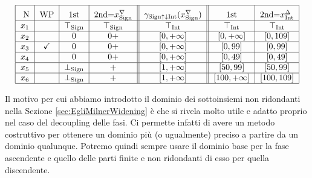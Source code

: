 \begin{example}
\begin{table}[H]
\begin{minipage}{\textwidth}
\[\begin{tabular}{|c|c|c|c||c||c|c|c||}
        \hline 
        \rule{0pt}{14pt} N & WP & 1st & 2nd=\(x^{\nabla}_{\textrm{Sign}}\) & 
        \(\gamma_{\textrm{Sign}\uparrow\downarrow\textrm{Int}}(x^{\nabla}_{\textrm{Sign}})\)& 
        1st & 2nd=\(x^{\Delta}_{\textrm{Int}}\)  \\
        \hline
        $x_1$ &  &  
            $\top_{\textrm{Sign}}$ & $\top_{\textrm{Sign}}$ & 
            $\top_{\textrm{Int}}$ & 
            $\top_{\textrm{Int}}$ & $\top_{\textrm{Int}}$ \\
        \hline
        $x_2$ &  & 
            0 & 0+ & 
            $\left[0, +\infty \right]$ & 
            $\left[0, +\infty \right]$ & $\left[0, 109\right]$ \\
        \hline
        $x_3$ & \checkmark & 
            0 & 0+ & 
            $\left[0, +\infty \right]$ & 
            $\left[0, 99\right]$ & $\left[0, 99\right]$ \\
        \hline
        $x_4$ &  & 
            0 & 0+ & 
            $\left[0, +\infty\right]$ & 
            $\left[0, 49\right]$ & $\left[0, 49\right]$ \\
        \hline
        $x_5$ &  & 
            $\perp_{\textrm{Sign}}$ & + & 
            $\left[1, +\infty \right]$ & 
            $\left[50, 99\right]$ & $\left[50, 99\right]$ \\
        \hline
        $x_6$ &  & 
            $\perp_{\textrm{Sign}}$ & + & 
            $\left[1, +\infty \right]$ & 
            $\left[100, +\infty \right]$ & $\left[100, 109\right]$ \\
        \hline
        \end{tabular}
        \]
    \end{minipage}
    \caption{Tabella dei risultati del dominio \(\textrm{Sign}\uparrow\downarrow\textrm{Int}\) divisi per step e fase.}
    \label{fig:risDecSingInt}
\end{table}
\end{example}

Il motivo per cui abbiamo introdotto il dominio dei sottoinsiemi non ridondanti nella Sezione \ref{sec:EgliMilnerWidening} è che si rivela molto utile e adatto proprio nel caso del decoupling delle fasi. Ci permette infatti di avere un metodo costruttivo per ottenere un dominio più (o ugualmente) preciso a partire da un dominio qualunque. Potremo quindi sempre usare il dominio base per la fase ascendente e quello delle parti finite e non ridondanti di esso per quella discendente. 

